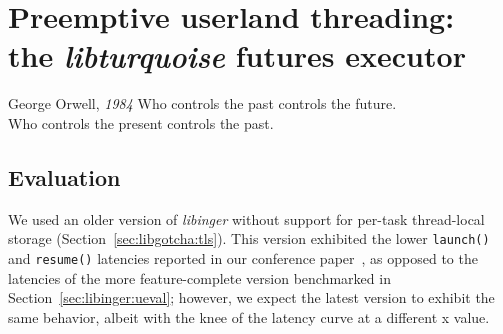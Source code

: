 \chapter{Preemptive userland threading: \\ the \textit{libturquoise} futures executor}
\label{chap:libturquoise}

\ifdefined\chapquotes
\vspace{-0.5in}
\begin{chapquote}[1.25in]{George Orwell, \textit{1984}}
Who controls the past controls the future. \\
Who controls the present controls the past.
\end{chapquote}
\fi

\begin{promotesubsections}
\begin{swallowsections}

\end{swallowsections}
\end{promotesubsections}


\section{Evaluation}




\hspace{-1em}
We used an older version of \textit{libinger} without support for per-task
thread-local storage (Section~\ref{sec:libgotcha:tls}).  This version exhibited the
lower \texttt{launch()} and \texttt{resume()} latencies reported in our conference
paper~\cite{boucher:atc2020}, as opposed to the latencies of the more
feature-complete version benchmarked in Section~\ref{sec:libinger:ueval}; however, we
expect the latest version to exhibit the same behavior, albeit with the knee of the
latency curve at a different x value.
